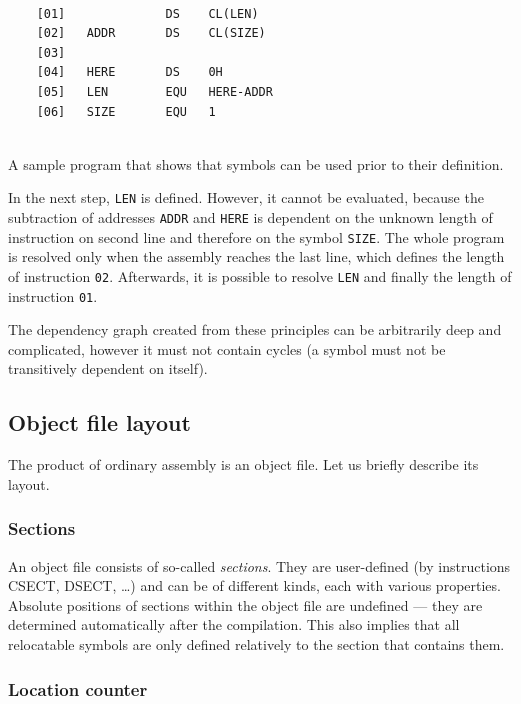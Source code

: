 \begin{listing}[t]
	\begin{verbatim}
	
	[01]              DS    CL(LEN)
	[02]   ADDR       DS    CL(SIZE)
	[03]
	[04]   HERE       DS    0H
	[05]   LEN        EQU   HERE-ADDR
	[06]   SIZE       EQU   1
	
	\end{verbatim}
	\caption{A sample program that shows that symbols can be used prior to their definition.}
	\label{lst:ordinary_assembly}
\end{listing}


In the next step, \verb|LEN| is defined. However, it cannot be evaluated, because the subtraction of addresses \verb|ADDR| and \verb|HERE| is dependent on the unknown length of instruction on second line and therefore on the symbol \verb|SIZE|. The whole program is resolved only when the assembly reaches the last line, which defines the length of instruction \verb|02|. Afterwards, it is possible to resolve \verb|LEN| and finally the length of instruction \verb|01|.

The dependency graph created from these principles can be arbitrarily deep and complicated, however it must not contain cycles (a symbol must not be transitively dependent on itself).

\subsection{Object file layout}

The product of ordinary assembly is an object file. Let us briefly describe its layout.

\subsubsection{Sections}

An object file consists of so-called \emph{sections}. They are user-defined (by instructions CSECT, DSECT, \ldots) and can be of different kinds, each with various properties. Absolute positions of sections within the object file are undefined --- they are determined automatically after the compilation. This also implies that all relocatable symbols are only defined relatively to the section that contains them.

\subsubsection{Location counter}
\label{loctr}

